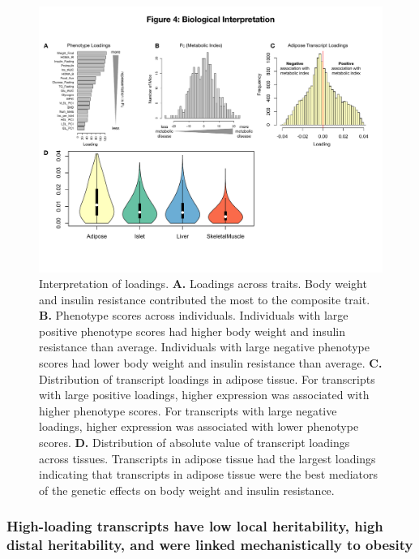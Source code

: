 \documentclass[
]{article}
\begin{document}
\begin{figure}[ht!]
\includegraphics[width=\textwidth]{Figures/Fig4_interpretation.pdf} 
\caption{Interpretation of loadings. \textbf{A.} Loadings 
across traits. Body weight and insulin resistance contributed 
the most to the composite trait. \textbf{B.} Phenotype scores 
across individuals. Individuals with large positive phenotype 
scores had higher body weight and insulin resistance than average. 
Individuals with large negative phenotype scores had lower body 
weight and insulin resistance than average. \textbf{C.} 
Distribution of transcript loadings in adipose tissue. For 
transcripts with large positive loadings, higher expression was 
associated with higher phenotype scores. For transcripts with 
large negative loadings, higher expression was associated with 
lower phenotype scores. \textbf{D.} Distribution of absolute 
value of transcript loadings across tissues. Transcripts in 
adipose tissue had the largest loadings indicating that 
transcripts in adipose tissue were the best mediators of the 
genetic effects on body weight and insulin resistance.
}
\label{fig:interpretation}
\end{figure}

\subsubsection{High-loading transcripts have low local heritability,
high distal heritability, and were linked mechanistically to
obesity}\label{high-loading-transcripts-have-low-local-heritability-high-distal-heritability-and-were-linked-mechanistically-to-obesity}
\end{document}
